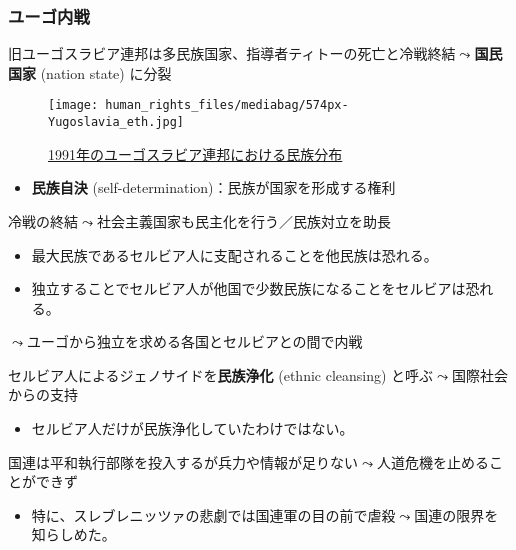 \documentclass[
  xelatex,
  ja=standard]{bxjsarticle}
\providecommand{\tightlist}{%
  \setlength{\itemsep}{0pt}\setlength{\parskip}{0pt}}\usepackage{longtable,booktabs,array}
\begin{document}
\hypertarget{ux30e6ux30fcux30b4ux5185ux6226}{%
\subsubsection{ユーゴ内戦}\label{ux30e6ux30fcux30b4ux5185ux6226}}

旧ユーゴスラビア連邦は多民族国家、指導者ティトーの死亡と冷戦終結\(\leadsto\)\textbf{国民国家}
(nation state) に分裂

\begin{figure}[htpb]

{\centering \texttt{[image: human\_rights\_files/mediabag/574px-Yugoslavia\_eth.jpg]}

}

\caption{\href{https://commons.wikimedia.org/wiki/File:Yugoslavia_ethnic_map.jpg}{1991年のユーゴスラビア連邦における民族分布}}

\end{figure}

\begin{itemize}
\tightlist
\item
  \textbf{民族自決} (self-determination)：民族が国家を形成する権利
\end{itemize}

冷戦の終結\(\leadsto\)社会主義国家も民主化を行う／民族対立を助長

\begin{itemize}
\tightlist
\item
  最大民族であるセルビア人に支配されることを他民族は恐れる。
\item
  独立することでセルビア人が他国で少数民族になることをセルビアは恐れる。
\end{itemize}

\(\leadsto\)ユーゴから独立を求める各国とセルビアとの間で内戦

セルビア人によるジェノサイドを\textbf{民族浄化} (ethnic cleansing)
と呼ぶ\(\leadsto\)国際社会からの支持

\begin{itemize}
\tightlist
\item
  セルビア人だけが民族浄化していたわけではない。
\end{itemize}

国連は平和執行部隊を投入するが兵力や情報が足りない\(\leadsto\)人道危機を止めることができず

\begin{itemize}
\tightlist
\item
  特に、スレブレニッツァの悲劇では国連軍の目の前で虐殺\(\leadsto\)国連の限界を知らしめた。
\end{itemize}
\end{document}
